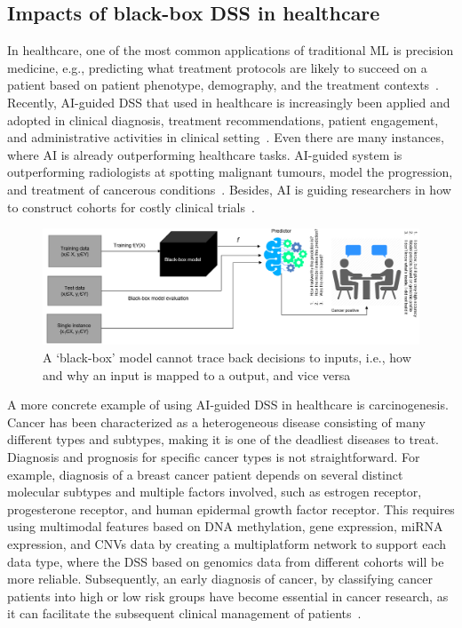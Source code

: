 \subsection{Impacts of black-box DSS in healthcare}
In healthcare, one of the most common applications of traditional ML is precision medicine, e.g., predicting what treatment protocols are likely to succeed on a patient based on patient phenotype, demography, and the treatment contexts~\cite{davenport2019potential}. Recently, AI-guided DSS that used in healthcare is increasingly been applied and adopted in clinical diagnosis, treatment recommendations, patient engagement, and administrative activities in clinical setting~\cite{deepmindhealth}. Even there are many instances, where AI is already outperforming healthcare tasks. AI-guided system is outperforming radiologists at spotting malignant tumours, model the progression, and treatment of cancerous conditions~\cite{deepmindhealth}. Besides, AI is guiding researchers in how to construct cohorts for costly clinical trials~\cite{davenport2019potential}. 

\begin{figure}
	\centering
	\includegraphics[scale=0.6]{images/bbm.png}
	\caption{A `black-box' model cannot trace back decisions to inputs, i.e., how and why an input is mapped to a output, and vice versa}
    \label{fig:model_bbm2}
    \vspace{-2mm}
\end{figure}

\hspace*{3.5mm} A more concrete example of using AI-guided DSS in healthcare is carcinogenesis. Cancer has been characterized as a heterogeneous disease consisting of many different types and subtypes, making it is one of the deadliest diseases to treat. Diagnosis and prognosis for specific cancer types is not straightforward. For example, diagnosis of a breast cancer patient depends on several distinct molecular subtypes and multiple factors involved, such as estrogen receptor, progesterone receptor, and human epidermal growth factor receptor. %
This requires using multimodal features based on DNA methylation, gene expression, miRNA expression, and CNVs data by creating a multiplatform network to support each data type, where the DSS based on genomics data from different cohorts will be more reliable. Subsequently, an early diagnosis of cancer, by classifying cancer patients into high or low risk groups have become essential in cancer research, as it can facilitate the subsequent clinical management of patients~\cite{kourou2015machine}.  
